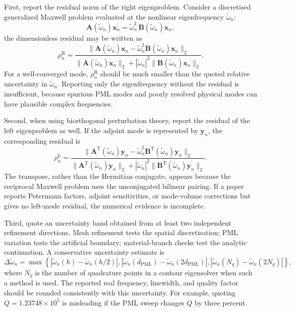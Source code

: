 First, report the residual norm of the right eigenproblem.  Consider a
discretised generalized Maxwell problem evaluated at the nonlinear
eigenfrequency $\tilde{\omega}_n$:
\begin{equation}
  \mathbf{A}(\tilde{\omega}_n)\mathbf{x}_n
  = \tilde{\omega}_n^2\,\mathbf{B}(\tilde{\omega}_n)\mathbf{x}_n,
  \label{eq:reporting-gep}
\end{equation}
the dimensionless residual may be written as
\begin{equation}
  \rho_n^{\mathrm{R}}
  = \frac{\|\mathbf{A}(\tilde{\omega}_n)\mathbf{x}_n
  - \tilde{\omega}_n^2\mathbf{B}(\tilde{\omega}_n)\mathbf{x}_n\|_2}
  {\|\mathbf{A}(\tilde{\omega}_n)\mathbf{x}_n\|_2
  + |\tilde{\omega}_n|^2\|\mathbf{B}(\tilde{\omega}_n)\mathbf{x}_n\|_2}.
  \label{eq:right-residual}
\end{equation}
For a well-converged mode, $\rho_n^{\mathrm{R}}$ should be much smaller
than the quoted relative uncertainty in $\tilde{\omega}_n$.  Reporting
only the eigenfrequency without the residual is insufficient, because
spurious PML modes and poorly resolved physical modes can have plausible
complex frequencies.

Second, when using biorthogonal perturbation theory, report the residual
of the left eigenproblem as well.  If the adjoint mode is represented by
$\mathbf{y}_n$, the corresponding residual is
\begin{equation}
  \rho_n^{\mathrm{L}}
  = \frac{\|\mathbf{A}^{\mathrm{T}}(\tilde{\omega}_n)\mathbf{y}_n
  - \tilde{\omega}_n^2\mathbf{B}^{\mathrm{T}}(\tilde{\omega}_n)\mathbf{y}_n\|_2}
  {\|\mathbf{A}^{\mathrm{T}}(\tilde{\omega}_n)\mathbf{y}_n\|_2
  + |\tilde{\omega}_n|^2\|\mathbf{B}^{\mathrm{T}}(\tilde{\omega}_n)\mathbf{y}_n\|_2}.
  \label{eq:left-residual}
\end{equation}
The transpose, rather than the Hermitian conjugate, appears because the
reciprocal Maxwell problem uses the unconjugated bilinear pairing.  If a
paper reports Petermann factors, adjoint sensitivities, or mode-volume
corrections but gives no left-mode residual, the numerical evidence is
incomplete.

Third, quote an uncertainty band obtained from at least two independent
refinement directions.  Mesh refinement tests the spatial discretisation;
PML variation tests the artificial boundary; material-branch checks test
the analytic continuation.  A conservative uncertainty estimate is
\begin{equation}
  \Delta\tilde{\omega}_n
  = \max\left\{
  |\tilde{\omega}_n(h)-\tilde{\omega}_n(h/2)|,
  |\tilde{\omega}_n(d_{\mathrm{PML}})-\tilde{\omega}_n(2d_{\mathrm{PML}})|,
  |\tilde{\omega}_n(N_q)-\tilde{\omega}_n(2N_q)|
  \right\},
  \label{eq:qnm-uncertainty-band}
\end{equation}
where $N_q$ is the number of quadrature points in a contour eigensolver
when such a method is used.  The reported real frequency, linewidth, and
quality factor should be rounded consistently with this uncertainty.
For example, quoting $Q=1.23748\times10^5$ is misleading if the PML
sweep changes $Q$ by three percent.

